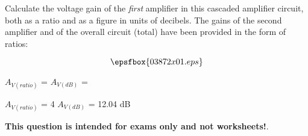 

Calculate the voltage gain of the {\it first} amplifier in this cascaded amplifier circuit, both as a ratio and as a figure in units of decibels.  The gains of the second amplifier and of the overall circuit (total) have been provided in the form of ratios:

$$\epsfbox{03872x01.eps}$$

$A_{V(ratio)}$ =  \hskip 80pt $A_{V(dB)}$ = 







$A_{V(ratio)}$ = 4 \hskip 50pt $A_{V(dB)}$ = 12.04 dB







{\bf This question is intended for exams only and not worksheets!}.



